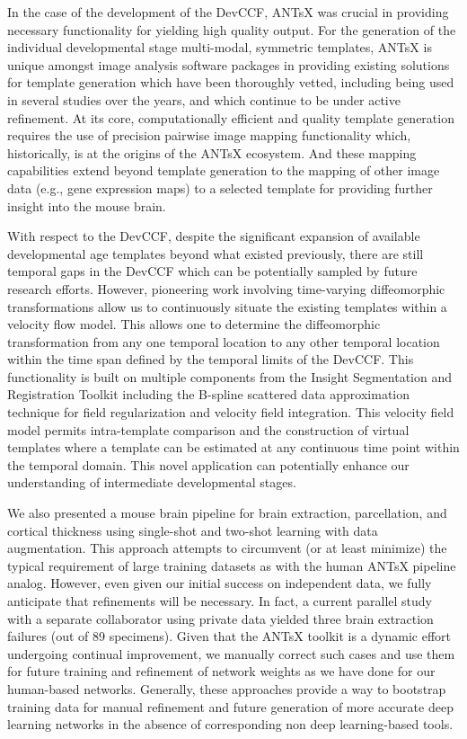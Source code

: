 \documentclass[
  12pt,
]{article}
\begin{document}
In the case of the development of the DevCCF, ANTsX was crucial in
providing necessary functionality for yielding high quality output. For
the generation of the individual developmental stage multi-modal,
symmetric templates, ANTsX is unique amongst image analysis software
packages in providing existing solutions for template generation which
have been thoroughly vetted, including being used in several studies
over the years, and which continue to be under active refinement. At its
core, computationally efficient and quality template generation requires
the use of precision pairwise image mapping functionality which,
historically, is at the origins of the ANTsX ecosystem. And these
mapping capabilities extend beyond template generation to the mapping of
other image data (e.g., gene expression maps) to a selected template for
providing further insight into the mouse brain.

With respect to the DevCCF, despite the significant expansion of
available developmental age templates beyond what existed previously,
there are still temporal gaps in the DevCCF which can be potentially
sampled by future research efforts. However, pioneering work involving
time-varying diffeomorphic transformations allow us to continuously
situate the existing templates within a velocity flow model. This allows
one to determine the diffeomorphic transformation from any one temporal
location to any other temporal location within the time span defined by
the temporal limits of the DevCCF. This functionality is built on
multiple components from the Insight Segmentation and Registration
Toolkit including the B-spline scattered data approximation technique
for field regularization and velocity field integration. This velocity
field model permits intra-template comparison and the construction of
virtual templates where a template can be estimated at any continuous
time point within the temporal domain. This novel application can
potentially enhance our understanding of intermediate developmental
stages.

We also presented a mouse brain pipeline for brain extraction,
parcellation, and cortical thickness using single-shot and two-shot
learning with data augmentation. This approach attempts to circumvent
(or at least minimize) the typical requirement of large training
datasets as with the human ANTsX pipeline analog. However, even given
our initial success on independent data, we fully anticipate that
refinements will be necessary. In fact, a current parallel study with a
separate collaborator using private data yielded three brain extraction
failures (out of 89 specimens). Given that the ANTsX toolkit is a
dynamic effort undergoing continual improvement, we manually correct
such cases and use them for future training and refinement of network
weights as we have done for our human-based networks. Generally, these
approaches provide a way to bootstrap training data for manual
refinement and future generation of more accurate deep learning networks
in the absence of corresponding non deep learning-based tools.
\end{document}
